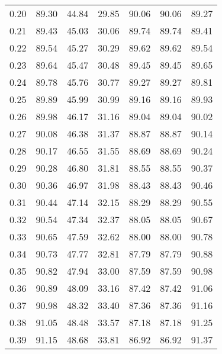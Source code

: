 \begin{tabular}{|c|c|c|c|c|c|c|}
      0.20 &     89.30 &     44.84 &      29.85 &   90.06 &      90.06 &         89.27 \\
      0.21 &     89.43 &     45.03 &      30.06 &   89.74 &      89.74 &         89.41 \\
      0.22 &     89.54 &     45.27 &      30.29 &   89.62 &      89.62 &         89.54 \\
      0.23 &     89.64 &     45.47 &      30.48 &   89.45 &      89.45 &         89.65 \\
      0.24 &     89.78 &     45.76 &      30.77 &   89.27 &      89.27 &         89.81 \\
      0.25 &     89.89 &     45.99 &      30.99 &   89.16 &      89.16 &         89.93 \\
      0.26 &     89.98 &     46.17 &      31.16 &   89.04 &      89.04 &         90.02 \\
      0.27 &     90.08 &     46.38 &      31.37 &   88.87 &      88.87 &         90.14 \\
      0.28 &     90.17 &     46.55 &      31.55 &   88.69 &      88.69 &         90.24 \\
      0.29 &     90.28 &     46.80 &      31.81 &   88.55 &      88.55 &         90.37 \\
      0.30 &     90.36 &     46.97 &      31.98 &   88.43 &      88.43 &         90.46 \\
      0.31 &     90.44 &     47.14 &      32.15 &   88.29 &      88.29 &         90.55 \\
      0.32 &     90.54 &     47.34 &      32.37 &   88.05 &      88.05 &         90.67 \\
      0.33 &     90.65 &     47.59 &      32.62 &   88.00 &      88.00 &         90.78 \\
      0.34 &     90.73 &     47.77 &      32.81 &   87.79 &      87.79 &         90.88 \\
      0.35 &     90.82 &     47.94 &      33.00 &   87.59 &      87.59 &         90.98 \\
      0.36 &     90.89 &     48.09 &      33.16 &   87.42 &      87.42 &         91.06 \\
      0.37 &     90.98 &     48.32 &      33.40 &   87.36 &      87.36 &         91.16 \\
      0.38 &     91.05 &     48.48 &      33.57 &   87.18 &      87.18 &         91.25 \\
      0.39 &     91.15 &     48.68 &      33.81 &   86.92 &      86.92 &         91.37 \\

\end{tabular}
